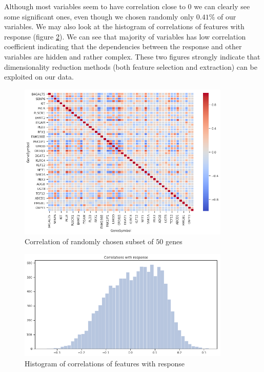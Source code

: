\documentclass[shortabstract, english, mgr]{iithesis}
\begin{document}
Although most variables seem to have correlation close to $0$ we can clearly see some significant ones, even though we chosen randomly only $0.41$\% of our variables. We may also look at the histogram of correlations of features with response (figure \ref{fig:corrHist}). We can see that majority of variables has low correlation coefficient indicating that the dependencies between the response and other variables are hidden and rather complex. These two figures strongly indicate that dimensionality reduction methods (both feature selection and extraction) can be exploited on our data.

\begin{figure}
\centering
\includegraphics[width=0.9\textwidth]{images/heatmap.png}
\caption{Correlation of randomly chosen subset of $50$ genes}
\label{fig:heatmap}
\end{figure}

\begin{figure}
\centering
\includegraphics[width=0.9\textwidth]{images/corrHist.png}
\caption{Histogram of correlations of features with response}
\label{fig:corrHist}
\end{figure}
\end{document}
